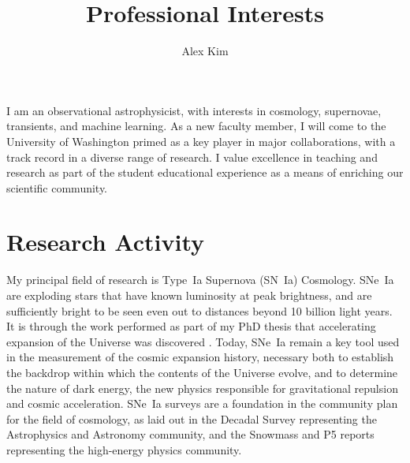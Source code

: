 \documentclass{article}
\begin{document}
\title{Professional Interests}
\author{Alex Kim}
\maketitle

I am an observational astrophysicist, with interests in
cosmology, supernovae, transients, and machine learning.
As a new faculty member, I will come to the University of Washington
primed as a key player in major collaborations, with a
track record in a diverse range of research.  I  value excellence
in teaching and research as part of the student educational experience
as a means of enriching our scientific community.

\section{Research Activity}
My principal field of research is  Type~Ia Supernova (SN~Ia) Cosmology. 
SNe~Ia are exploding stars that have known luminosity at peak brightness, and are sufficiently bright to be
seen even out to distances beyond 10 billion light years.  It is through the work
performed as part of my PhD thesis that accelerating
expansion of the Universe was discovered \cite{1997ApJ...483..565P}.  Today, SNe~Ia remain a key tool used in
the measurement of the cosmic expansion history, necessary both to establish
the  backdrop within which the contents of the Universe evolve,
and to determine the nature of dark energy, the new physics responsible
for gravitational repulsion and cosmic acceleration.
SNe~Ia surveys are a foundation in the community plan for the field of cosmology,
as laid out in
the Decadal Survey representing the Astrophysics and Astronomy community, and the Snowmass
\cite{2013arXiv1309.5386D,2013arXiv1309.5382K} and P5 reports
representing the high-energy physics community.
\end{document}
